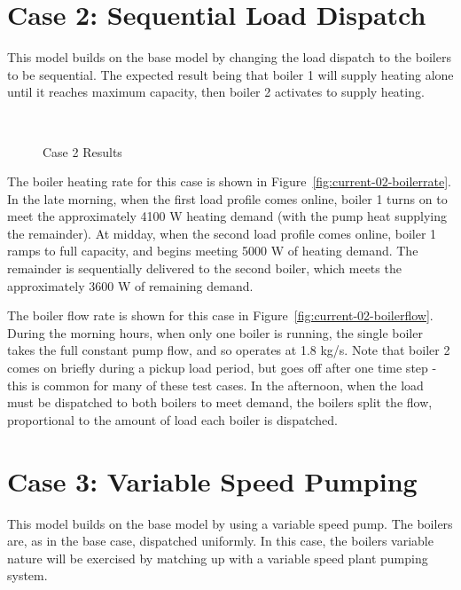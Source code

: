 \documentclass{report}
\begin{document}
    \section{Case 2: Sequential Load Dispatch}\label{sec:current-02}

      This model builds on the base model by changing the load dispatch to the boilers to be sequential.
      The expected result being that boiler 1 will supply heating alone until it reaches maximum capacity, then boiler 2 activates to supply heating.

      \begin{figure*}[hbt]
        \centering
        ~
        \caption{Case 2 Results}
      \end{figure*}

      The boiler heating rate for this case is shown in Figure~\ref{fig:current-02-boilerrate}.
      In the late morning, when the first load profile comes online, boiler 1 turns on to meet the approximately 4100 W heating demand (with the pump heat supplying the remainder).
      At midday, when the second load profile comes online, boiler 1 ramps to full capacity, and begins meeting 5000 W of heating demand.
      The remainder is sequentially delivered to the second boiler, which meets the approximately 3600 W of remaining demand.

      The boiler flow rate is shown for this case in Figure~\ref{fig:current-02-boilerflow}.
      During the morning hours, when only one boiler is running, the single boiler takes the full constant pump flow, and so operates at 1.8 kg/s.
      Note that boiler 2 comes on briefly during a pickup load period, but goes off after one time step - this is common for many of these test cases.
      In the afternoon, when the load must be dispatched to both boilers to meet demand, the boilers split the flow, proportional to the amount of load each boiler is dispatched.

    \section{Case 3: Variable Speed Pumping}\label{sec:current-03}

      This model builds on the base model by using a variable speed pump.
      The boilers are, as in the base case, dispatched uniformly.
      In this case, the boilers variable nature will be exercised by matching up with a variable speed plant pumping system.
\end{document}
